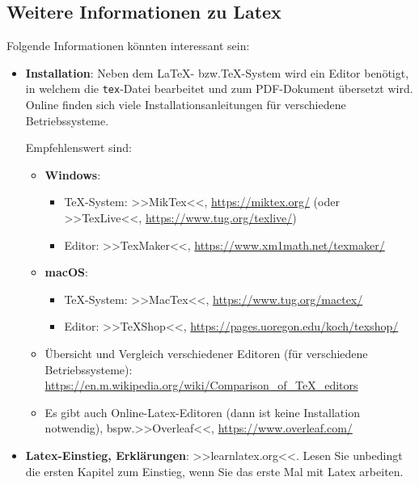 \documentclass[11pt, a4paper, oneside, openright]{article}
\newcommand \bspw{bspw.\xspace }
\newcommand \bzw{bzw.\xspace }
\begin{document}
\subsection{Weitere Informationen zu Latex}
\label{sec:infosLatex}
Folgende Informationen könnten interessant sein:

\begin{itemize}
    \item \textbf{Installation}: Neben dem \LaTeX- \bzw \TeX-System wird ein Editor benötigt, in welchem die \texttt{tex}-Datei bearbeitet und zum PDF-Dokument übersetzt wird. Online finden sich viele Installationsanleitungen für verschiedene Betriebssysteme.
    
    Empfehlenswert sind:
        \begin{itemize}
            \item \textbf{Windows}:
                    \begin{itemize}
                        \item \TeX-System: >>MikTex<<, \url{https://miktex.org/} (oder >>TexLive<<, \url{https://www.tug.org/texlive/})
                        \item Editor: >>TexMaker<<, \url{https://www.xm1math.net/texmaker/}
                    \end{itemize}
    
            \item \textbf{macOS}:
                    \begin{itemize}
                        \item \TeX-System: >>MacTex<<, \url{https://www.tug.org/mactex/}
                        \item Editor: >>TeXShop<<, \url{https://pages.uoregon.edu/koch/texshop/}
                    \end{itemize}
            \item Übersicht und Vergleich verschiedener Editoren (für verschiedene Betriebssysteme): \url{https://en.m.wikipedia.org/wiki/Comparison_of_TeX_editors}
            
            \item Es gibt auch Online-Latex-Editoren (dann ist keine Installation notwendig), \bspw >>Overleaf<<, \url{https://www.overleaf.com/}
        \end{itemize}
    
    \item \textbf{Latex-Einstieg, Erklärungen}:     >>learnlatex.org<<. Lesen Sie unbedingt die ersten Kapitel zum Einstieg, wenn Sie das erste Mal mit Latex arbeiten.
        

\end{itemize}
\end{document}
